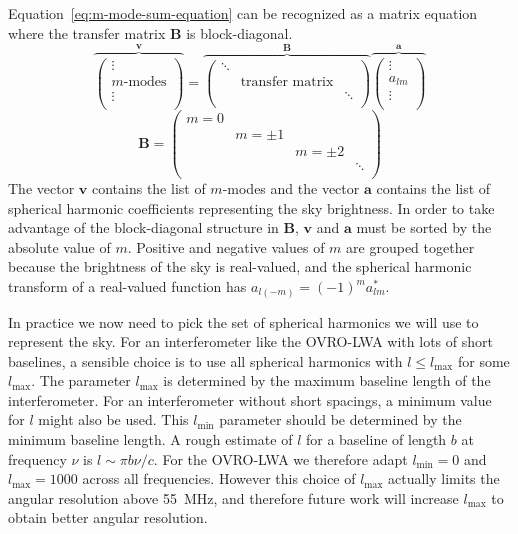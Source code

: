\documentclass[twocolumn]{aastex61}
\renewcommand{\b}{\pmb}
\begin{document}
Equation~\ref{eq:m-mode-sum-equation} can be recognized as a matrix equation where the transfer
matrix $\b B$ is block-diagonal.
\begin{equation}\label{eq:m-mode-matrix-equation}
    \overbrace{\left(
        \begin{array}{c}
            \vdots \\
            m\text{-modes} \\
            \vdots \\
        \end{array}
    \right)}^{\b v}
    =
    \overbrace{\left(
        \begin{array}{ccc}
            \ddots & & \\
            & \text{transfer matrix} & \\
            & & \ddots \\
        \end{array}
    \right)}^{\b B}
    \overbrace{\left(
        \begin{array}{c}
            \vdots \\
            a_{lm} \\
            \vdots \\
        \end{array}
    \right)}^{\b a}
\end{equation}
\begin{equation}
    \b B = \left(\begin{array}{cccc}
        m = 0 &&& \\
              & m=\pm1 && \\
              && m=\pm2 & \\
              &&& \ddots \\
    \end{array}\right)
\end{equation}
The vector $\b v$ contains the list of $m$-modes and the vector $\b a$ contains the list of
spherical harmonic coefficients representing the sky brightness. In order to take advantage of the
block-diagonal structure in $\b B$, $\b v$ and $\b a$ must be sorted by the absolute value of $m$.
Positive and negative values of $m$ are grouped together because the brightness of the sky is
real-valued, and the spherical harmonic transform of a real-valued function has $a_{l(-m)} = (-1)^m
a_{lm}^*$.

In practice we now need to pick the set of spherical harmonics we will use to represent the sky. For
an interferometer like the OVRO-LWA with lots of short baselines, a sensible choice is to use all
spherical harmonics with $l\le l_\text{max}$ for some $l_\text{max}$. The parameter $l_\text{max}$
is determined by the maximum baseline length of the interferometer.  For an interferometer without
short spacings, a minimum value for $l$ might also be used. This $l_\text{min}$ parameter should be
determined by the minimum baseline length. A rough estimate of $l$ for a baseline of length $b$ at
frequency $\nu$ is $l \sim \pi b\nu/c$. For the OVRO-LWA we therefore adapt $l_\text{min}=0$ and
$l_\text{max}=1000$ across all frequencies. However this choice of $l_\text{max}$ actually limits
the angular resolution above 55~MHz, and therefore future work will increase $l_\text{max}$ to
obtain better angular resolution.
\end{document}
